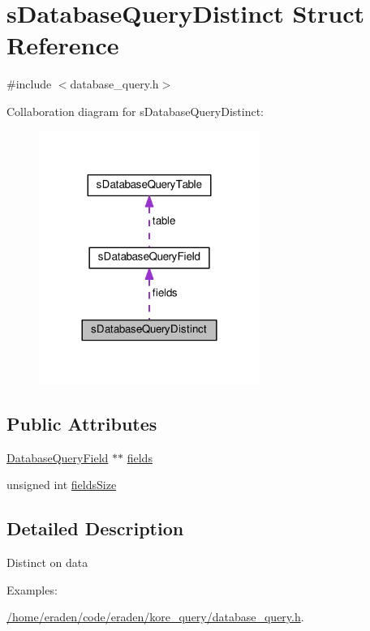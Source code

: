 \hypertarget{structsDatabaseQueryDistinct}{}\section{s\+Database\+Query\+Distinct Struct Reference}
\label{structsDatabaseQueryDistinct}


{\ttfamily \#include $<$database\+\_\+query.\+h$>$}



Collaboration diagram for s\+Database\+Query\+Distinct\+:\nopagebreak
\begin{figure}[H]
\begin{center}
\leavevmode
\includegraphics[width=204pt]{structsDatabaseQueryDistinct__coll__graph}
\end{center}
\end{figure}
\subsection*{Public Attributes}
\begin{DoxyCompactItemize}
\item 
\hyperlink{database__query_8h_a88215d743b6fc63a879f730b4523dda1}{Database\+Query\+Field} $\ast$$\ast$ \hyperlink{structsDatabaseQueryDistinct_a78ff1f92d133772c3c310dec754cfa60}{fields}
\item 
unsigned int \hyperlink{structsDatabaseQueryDistinct_adefbf680f57431d687f31f2f1a0ba04b}{fields\+Size}
\end{DoxyCompactItemize}


\subsection{Detailed Description}
Distinct on data \begin{Desc}
\item[Examples\+: ]\par
\hyperlink{_2home_2eraden_2code_2eraden_2kore_query_2database_query_8h-example}{/home/eraden/code/eraden/kore\+\_\+query/database\+\_\+query.\+h}.\end{Desc}


